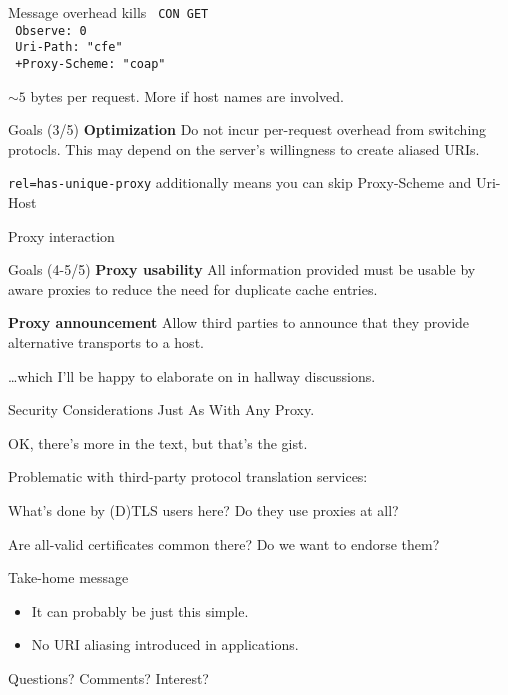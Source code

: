 \documentclass[aspectratio=169]{beamer}
\begin{document}
\begin{frame}{Message overhead kills}\large
	{\texttt{
	 CON GET\\
	~Observe: 0\\
	~Uri-Path: "cfe"\\
	}\color{darkgreen}\texttt{%
	+Proxy-Scheme: "coap"
	}}

	\bigskip

	$\sim 5$ bytes per request. More if host names are involved.

	\begin{block}{Goals (3/5)}
		\textbf{Optimization} Do not incur per-request overhead from switching protocls. This may depend on the server's willingness to create aliased URIs.
	\end{block}

	\texttt{rel=}{\color{blue}\texttt{has-unique-proxy}} additionally means you can skip Proxy-Scheme and Uri-Host
\end{frame}

\begin{frame}{Proxy interaction}\large
	\begin{block}{Goals (4-5/5)}
		\textbf{Proxy usability} All information provided must be usable by aware proxies to reduce the need for duplicate cache entries.

		\textbf{Proxy announcement} Allow third parties to announce that they provide alternative transports to a host.
	\end{block}

	\bigskip

	\ldots which I'll be happy to elaborate on in hallway discussions.
\end{frame}

\begin{frame}{Security Considerations}
	\Huge Just As With Any Proxy.

	\bigskip

	\footnotesize OK, there's more in the text, but that's the gist.

	\vspace{3cm}

	\large Problematic with third-party protocol translation services:

	What's done by (D)TLS users here? Do they use proxies at all?

	Are all-valid certificates common there? Do we want to endorse them?
\end{frame}

\begin{frame}{Take-home message}\Large 
	\begin{itemize}
		\item It can probably be just this simple.
		\item No URI aliasing introduced in applications.
	\end{itemize}

	\vspace{2cm}

	Questions? Comments? Interest?
\end{frame}
\end{document}
